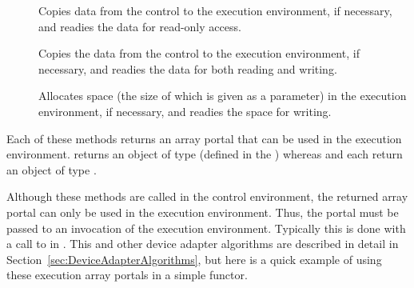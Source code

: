 \begin{description}
\item[]  Copies data from
  the control to the execution environment, if necessary, and readies the
  data for read-only access.
\item[]  Copies the
  data from the control to the execution environment, if necessary, and
  readies the data for both reading and writing.
\item[]  Allocates space
  (the size of which is given as a parameter) in the execution environment,
  if necessary, and readies the space for writing.
\end{description}

Each of these methods returns an array portal that can be used in the
execution environment.  returns an object of type
 (defined in the
) whereas  and
 each return an object of type
.

Although these  methods are called in the control
environment, the returned array portal can only be used in the execution
environment. Thus, the portal must be passed to an invocation of the
execution environment. Typically this is done with a call to
 in . This and other
device adapter algorithms are described in detail in
Section~\ref{sec:DeviceAdapterAlgorithms}, but here is a quick example of
using these execution array portals in a simple functor.

